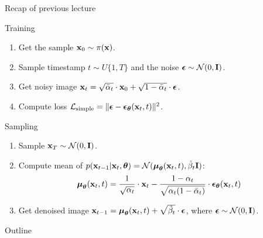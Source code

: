 \begin{frame}{Recap of previous lecture}
	\begin{block}{Training}
		\begin{enumerate}
			\item Get the sample $\mathbf{x}_0 \sim \pi(\mathbf{x})$.
			\item Sample timestamp $t \sim U\{1, T\}$ and the noise $\boldsymbol{\epsilon} \sim \mathcal{N}(0, \mathbf{I})$.
			\item Get noisy image $\mathbf{x}_t = \sqrt{\bar{\alpha}_t} \cdot \mathbf{x}_0 + \sqrt{1 - \bar{\alpha}_t} \cdot \boldsymbol{\epsilon}$.
			\item Compute loss $ \mathcal{L}_{\text{simple}} = \| \boldsymbol{\epsilon} - \boldsymbol{\epsilon}_{\boldsymbol{\theta}}(\mathbf{x}_t , t) \|^2 $.
		\end{enumerate}
	\end{block}
	\begin{block}{Sampling}
		\begin{enumerate}
			\item Sample $\mathbf{x}_T \sim \mathcal{N}(0, \mathbf{I})$.
			\item Compute mean of $p(\mathbf{x}_{t-1} | \mathbf{x}_t, \boldsymbol{\theta}) = \mathcal{N}(\boldsymbol{\mu}_{\boldsymbol{\theta}}(\mathbf{x}_t, t), \tilde{\beta}_t \mathbf{I})$:
			\[
				\boldsymbol{\mu}_{\boldsymbol{\theta}}(\mathbf{x}_t, t) = \frac{1}{\sqrt{\alpha_t}} \cdot \mathbf{x}_t - \frac{1 - \alpha_t}{\sqrt{\alpha_t (1 - \bar{\alpha}_t)}} \cdot \boldsymbol{\epsilon}_{\boldsymbol{\theta}}(\mathbf{x}_t, t)
			\]
			\vspace{-0.3cm}
			\item Get denoised image $\mathbf{x}_{t - 1} = \boldsymbol{\mu}_{\boldsymbol{\theta}}(\mathbf{x}_t, t) +  \sqrt{\tilde{\beta}_t} \cdot \boldsymbol{\epsilon}$, where $\boldsymbol{\epsilon} \sim \mathcal{N}(0, \mathbf{I})$.
		\end{enumerate}
	\end{block}
\end{frame}
\begin{frame}{Outline}
	\tableofcontents
\end{frame}
